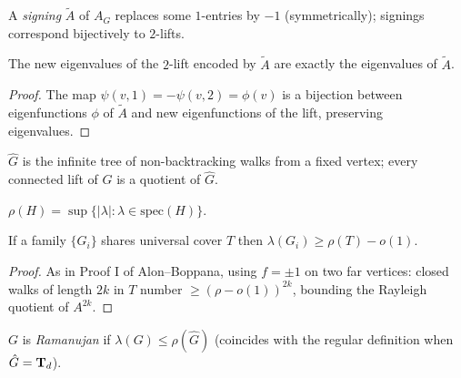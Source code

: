 \begin{definition}
  \label{def:signing}
  A \emph{signing} $\tilde A$ of $A_G$ replaces some $1$-entries by $-1$
  (symmetrically); signings correspond bijectively to $2$-lifts.
\end{definition}

\begin{proposition}
  \label{prop:2lift-signing}
  The new eigenvalues of the $2$-lift encoded by $\tilde A$ are exactly the
  eigenvalues of $\tilde A$.
\end{proposition}
\begin{proof}
  The map $\psi(v,1)=-\psi(v,2)=\phi(v)$ is a bijection between eigenfunctions
  $\phi$ of $\tilde A$ and new eigenfunctions of the lift, preserving
  eigenvalues.
\end{proof}

\begin{definition}
  \label{def:universal-cover}
  $\hat G$ is the infinite tree of non-backtracking walks from a fixed vertex;
  every connected lift of $G$ is a quotient of $\hat G$.
\end{definition}

\begin{definition}
  \label{def:spectral-radius}
  \mathlibok
  $\rho(H)=\sup\{|\lambda|:\lambda\in\mathrm{spec}(H)\}$.
\end{definition}

\begin{theorem}
  \label{thm:greenberg-lubotzky}
  If a family $\{G_i\}$ shares universal cover $T$ then
  $\lambda(G_i)\ge\rho(T)-o(1)$.
\end{theorem}
\begin{proof}
  As in Proof I of Alon--Boppana, using $f=\pm1$ on two far vertices: closed
  walks of length $2k$ in $T$ number $\ge(\rho-o(1))^{2k}$, bounding the Rayleigh
  quotient of $A^{2k}$.
\end{proof}

\begin{definition}
  \label{def:irregular-ramanujan}
  $G$ is \emph{Ramanujan} if $\lambda(G)\le\rho(\hat G)$ (coincides with the
  regular definition when $\hat G=\mathbf{T}_d$).
\end{definition}

